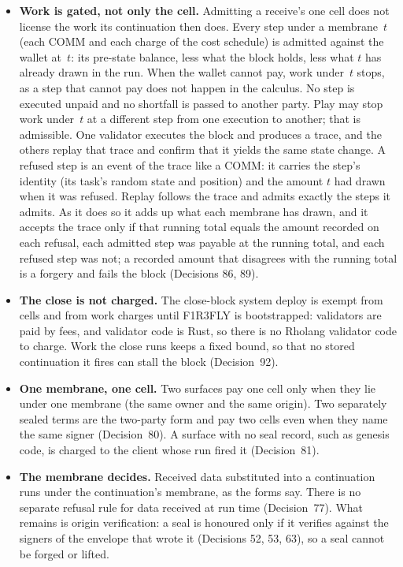 \documentclass[11pt]{article}
\begin{document}
\begin{itemize}
\item \textbf{Work is gated, not only the cell.} Admitting a receive's one cell does not license the work its continuation then does. Every step under a membrane~$t$ (each COMM and each charge of the cost schedule) is admitted against the wallet at~$t$: its pre-state balance, less what the block holds, less what $t$ has already drawn in the run. When the wallet cannot pay, work under~$t$ stops, as a step that cannot pay does not happen in the calculus. No step is executed unpaid and no shortfall is passed to another party. Play may stop work under~$t$ at a different step from one execution to another; that is admissible. One validator executes the block and produces a trace, and the others replay that trace and confirm that it yields the same state change. A refused step is an event of the trace like a COMM: it carries the step's identity (its task's random state and position) and the amount $t$ had drawn when it was refused. Replay follows the trace and admits exactly the steps it admits. As it does so it adds up what each membrane has drawn, and it accepts the trace only if that running total equals the amount recorded on each refusal, each admitted step was payable at the running total, and each refused step was not; a recorded amount that disagrees with the running total is a forgery and fails the block (Decisions 86, 89).
\item \textbf{The close is not charged.} The close-block system deploy is exempt from cells and from work charges until F1R3FLY is bootstrapped: validators are paid by fees, and validator code is Rust, so there is no Rholang validator code to charge. Work the close runs keeps a fixed bound, so that no stored continuation it fires can stall the block (Decision~92).
\item \textbf{One membrane, one cell.} Two surfaces pay one cell only when they lie under one membrane (the same owner and the same origin). Two separately sealed terms are the two-party form and pay two cells even when they name the same signer (Decision~80). A surface with no seal record, such as genesis code, is charged to the client whose run fired it (Decision~81).
\item \textbf{The membrane decides.} Received data substituted into a continuation runs under the continuation's membrane, as the forms say. There is no separate refusal rule for data received at run time (Decision~77). What remains is origin verification: a seal is honoured only if it verifies against the signers of the envelope that wrote it (Decisions 52, 53, 63), so a seal cannot be forged or lifted.
\end{itemize}
\end{document}
